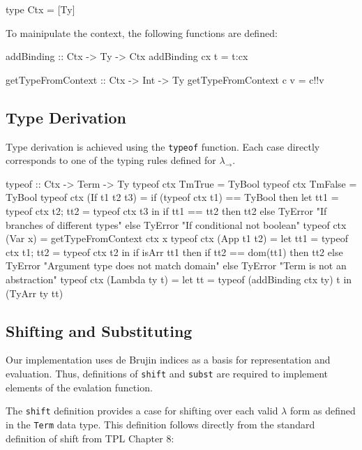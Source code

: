 \documentclass[10pt]{article}
\begin{document}
\begin{code}
  type Ctx = [Ty]
\end{code}

To mainipulate the context, the following functions are defined:

\begin{code}
  addBinding :: Ctx -> Ty -> Ctx
  addBinding cx t = t:cx

  getTypeFromContext :: Ctx -> Int -> Ty
  getTypeFromContext c v = c!!v
\end{code} 

\subsection{Type Derivation}

Type derivation is achieved using the \texttt{typeof} function.  Each
case directly corresponds to one of the typing rules defined for
$\lambda_\rightarrow$.

\begin{code}
  typeof :: Ctx -> Term -> Ty
  typeof ctx TmTrue = TyBool
  typeof ctx TmFalse = TyBool
  typeof ctx (If t1 t2 t3) =
      if (typeof ctx t1) == TyBool
         then let tt1 = typeof ctx t2; tt2 = typeof ctx t3 in
                  if tt1 == tt2 then tt2 else TyError "If branches of different types"
         else TyError "If conditional not boolean"
  typeof ctx (Var x) = getTypeFromContext ctx x
  typeof ctx (App t1 t2) = 
      let tt1 = typeof ctx t1; tt2 = typeof ctx t2 in
         if isArr tt1 then 
            if tt2 == dom(tt1) then tt2
               else TyError "Argument type does not match domain"
            else TyError "Term is not an abstraction"           
  typeof ctx (Lambda ty t) =
      let tt = typeof (addBinding ctx ty) t in
         (TyArr ty tt)
\end{code}

\subsection{Shifting and Substituting}

Our implementation uses de Brujin indices as a basis for
representation and evaluation.  Thus, definitions of \texttt{shift}
and \texttt{subst} are required to implement elements of the evalation
function.

The \texttt{shift} definition provides a case for shifting over each
valid $\lambda$ form as defined in the \texttt{Term} data type.  This
definition follows directly from the standard definition of shift from
TPL Chapter 8:
\end{document}
